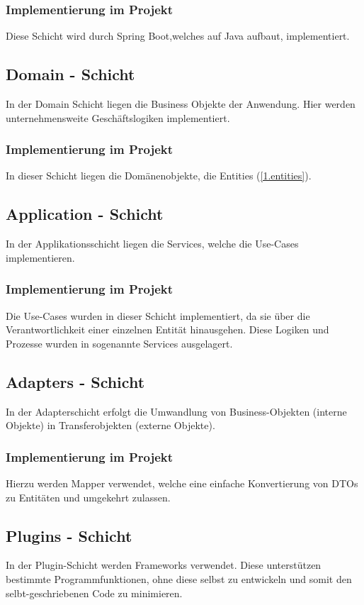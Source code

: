     		\subsubsection{Implementierung im Projekt}
    		Diese Schicht wird durch Spring Boot,welches auf Java aufbaut, implementiert. 
    	
    	\subsection{Domain - Schicht}
    	In der Domain Schicht liegen die Business Objekte der Anwendung. Hier werden unternehmensweite Geschäftslogiken implementiert.
    		\subsubsection{Implementierung im Projekt}
    		In dieser Schicht liegen die Domänenobjekte, die Entities (\cref{1.entities}).
    	
    	\subsection{Application - Schicht}
    	In der Applikationsschicht liegen die Services, welche die Use-Cases implementieren.
    		\subsubsection{Implementierung im Projekt}
    		Die Use-Cases wurden in dieser Schicht implementiert, da sie über die Verantwortlichkeit einer einzelnen Entität hinausgehen. Diese Logiken und Prozesse wurden in sogenannte Services ausgelagert.
    	
    	\subsection{Adapters - Schicht}
    	In der Adapterschicht erfolgt die Umwandlung von Business-Objekten (interne Objekte) in Transferobjekten (externe Objekte).
    		\subsubsection{Implementierung im Projekt}
    		Hierzu werden Mapper verwendet, welche eine einfache Konvertierung von DTOs zu Entitäten und umgekehrt zulassen.
    		
    	\subsection{Plugins - Schicht}
    	In der Plugin-Schicht werden Frameworks verwendet. Diese unterstützen bestimmte Programmfunktionen, ohne diese selbst zu entwickeln und somit den selbt-geschriebenen Code zu minimieren.
